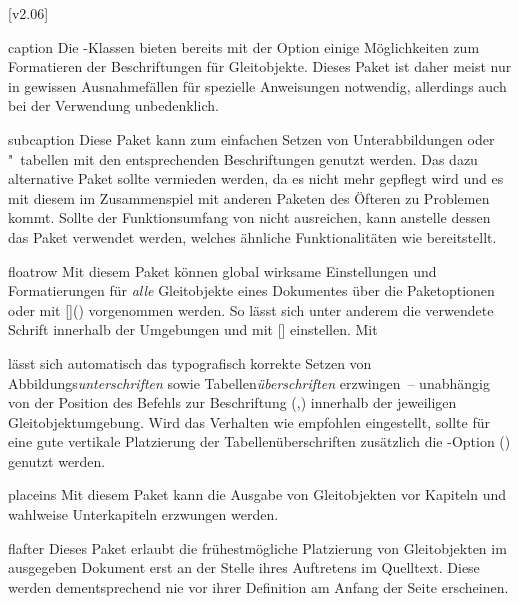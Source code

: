[v2.06]
%
%
\begin{packages}
\item[caption]
  Die \KOMAScript-Klassen bieten bereits mit der Option 
  einige Möglichkeiten zum Formatieren 
  der Beschriftungen für Gleitobjekte. Dieses Paket ist daher meist nur in 
  gewissen Ausnahmefällen für spezielle Anweisungen notwendig, allerdings auch 
  bei der Verwendung unbedenklich.
\item[subcaption]
  Diese Paket kann zum einfachen Setzen von Unterabbildungen oder "~tabellen 
  mit den entsprechenden Beschriftungen genutzt werden. Das dazu alternative 
  Paket  sollte vermieden werden, da es nicht mehr gepflegt 
  wird und es mit diesem im Zusammenspiel mit anderen Paketen des Öfteren zu 
  Problemen kommt. Sollte der Funktionsumfang von  nicht 
  ausreichen, kann anstelle dessen das Paket  verwendet 
  werden, welches ähnliche Funktionalitäten wie  bereitstellt.
\item[floatrow]
  Mit diesem Paket können global wirksame Einstellungen und Formatierungen für 
  \emph{alle} Gleitobjekte eines Dokumentes über die Paketoptionen oder mit 
  [\MPValue{\dots}]() vorgenommen werden. 
  So lässt sich unter anderem die verwendete Schrift innerhalb der Umgebungen 
   und  mit  
  [] einstellen. Mit 
  \begin{Code}
  \end{Code}\vspace{-\baselineskip}%
  lässt sich automatisch das typografisch korrekte Setzen von 
  Abbildungs\emph{unterschriften} sowie Tabellen\emph{überschriften} 
  erzwingen~-- unabhängig von der Position des Befehls zur Beschriftung 
  (,) innerhalb der 
  jeweiligen Gleitobjektumgebung. Wird das Verhalten wie empfohlen eingestellt, 
  sollte für eine gute vertikale Platzierung der Tabellenüberschriften 
  zusätzlich die \KOMAScript-Option 
  () genutzt werden.
\item[placeins]
  Mit diesem Paket kann die Ausgabe von Gleitobjekten vor Kapiteln und wahlweise
  Unterkapiteln erzwungen werden.
\item[flafter]
  Dieses Paket erlaubt die frühestmögliche Platzierung von Gleitobjekten im 
  ausgegeben Dokument erst an der Stelle ihres Auftretens im Quelltext. Diese 
  werden dementsprechend nie vor ihrer Definition am Anfang der Seite 
  erscheinen.
\end{packages}
